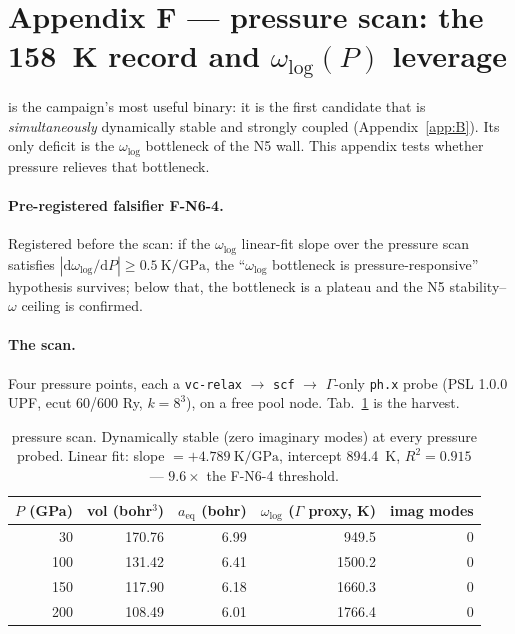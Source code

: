 \section{Appendix F ---  pressure scan: the \SI{158}{\kelvin}
record and $\omega_{\log}(P)$ leverage}
\label{app:F}

 is the campaign's most useful binary: it is the first candidate
that is \emph{simultaneously} dynamically stable and strongly coupled
(Appendix~\ref{app:B}). Its only deficit is the $\omega_{\log}$ bottleneck of
the N5 wall. This appendix tests whether pressure relieves that bottleneck.

\paragraph{Pre-registered falsifier F-N6-4.}
Registered before the scan: if the $\omega_{\log}$ linear-fit slope over the
pressure scan satisfies $|\mathrm{d}\omega_{\log}/\mathrm{d}P| \ge
\SI{0.5}{\kelvin\per\giga\pascal}$, the ``$\omega_{\log}$ bottleneck is
pressure-responsive'' hypothesis survives; below that, the bottleneck is a
plateau and the N5 stability--$\omega$ ceiling is confirmed.

\paragraph{The scan.}
Four pressure points, each a \texttt{vc-relax} $\to$ \texttt{scf} $\to$
$\Gamma$-only \texttt{ph.x} probe (PSL 1.0.0 UPF, ecut 60/600 Ry, $k=8^3$),
on a free pool node. Tab.~\ref{tab:pscan} is the harvest.

\begin{table}[h]
\centering
\small
\begin{tabular}{rrrrr}
\toprule
\textbf{$P$ (GPa)} & \textbf{vol (bohr$^3$)} & \textbf{$a_{\mathrm{eq}}$ (bohr)} &
  \textbf{$\omega_{\log}$ ($\Gamma$ proxy, K)} & \textbf{imag modes} \\
\midrule
30  & 170.76 & 6.99 & 949.5  & 0 \\
100 & 131.42 & 6.41 & 1500.2 & 0 \\
150 & 117.90 & 6.18 & 1660.3 & 0 \\
200 & 108.49 & 6.01 & 1766.4 & 0 \\
\bottomrule
\end{tabular}
\caption{ pressure scan. Dynamically stable (zero imaginary modes)
at every pressure probed. Linear fit: slope $=
+\SI{4.789}{\kelvin\per\giga\pascal}$, intercept \SI{894.4}{\kelvin},
$R^2 = 0.915$ --- $9.6\times$ the F-N6-4 threshold.}
\label{tab:pscan}
\end{table}

